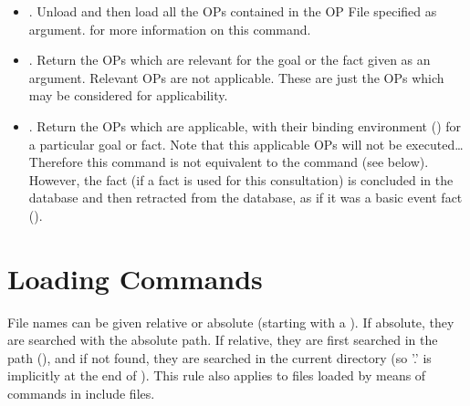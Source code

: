 \begin{itemize}
\item {}.  Unload and then load all the OPs
contained in the OP File specified as argument.  for more information on this command.

\item {}. Return the OPs which are relevant for
the goal or the fact given as an argument. Relevant OPs are not applicable.
These are just the OPs which may be considered for applicability.

\item {}. Return the OPs which are applicable, with
their binding environment () for a
particular goal or fact. Note that this applicable OPs will not be
executed\dots{} Therefore this command is not equivalent to the 
command (see below). However, the fact (if a fact is used for this
consultation) is concluded in the database and then retracted from the
database, as if it was a basic event fact ().

\end{itemize}

\section{\CPK{} Loading Commands}


File names can be given relative or absolute (starting with a
\samp{/}). If absolute, they are searched with the absolute path. If
relative, they are first searched in the  path
(), and if not found, they
are searched in the current directory (so '.' is implicitly at the end
of ). This rule also applies to files loaded by
means of commands in include files.


